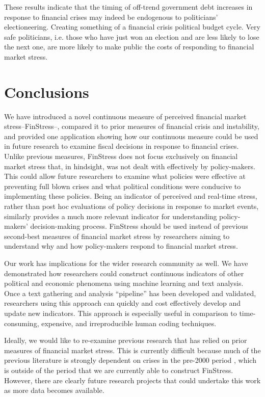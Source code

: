 \documentclass[]{article}
\begin{document}
These results indicate that the timing of off-trend government debt increases in response to financial crises may indeed be endogenous to politicians' electioneering. Creating something of a financial crisis political budget cycle. Very safe politicians, i.e. those who have just won an election and are less likely to lose the next one, are more likely to make public the costs of responding to financial market stress.


\section{Conclusions}\label{conclusions}

We have introduced a novel continuous measure of perceived financial market stress--FinStress--, compared it to prior measures of financial crisis and instability, and provided one application showing how our continuous measure could be used in future research to examine fiscal decisions in response to financial crises. Unlike previous measures, FinStress does not focus exclusively on financial market stress that, in hindsight, was not dealt with effectively by policy-makers. This could allow future researchers to examine what policies were effective at preventing full blown crises and what political conditions were conducive to implementing these policies. Being an indicator of perceived and real-time stress, rather than post hoc evaluations of policy decisions in response to market events, similarly provides a much more relevant indicator for understanding policy-makers' decision-making process. FinStress should be used instead of previous second-best measures of financial market stress by researchers aiming to understand why and how policy-makers respond to financial market stress.

Our work has implications for the wider research community as well. We have demonstrated how researchers could construct continuous indicators of other political and economic phenomena using machine learning and text analysis. Once a text gathering and analysis ``pipeline'' \citep{Leek2015} has been developed and validated, researchers using this approach can quickly and cost effectively develop and update new indicators. This approach is especially useful in comparison to time-consuming, expensive, and irreproducible human coding techniques.

Ideally, we would like to re-examine previous research that has relied on prior measures of financial market stress. This is currently difficult because much of the previous literature is strongly dependent on crises in the pre-2000 period \citep[see discussion in][]{GandrudHallerberg2015}, which is outside of the period that we are currently able to construct FinStress. However, there are clearly future research projects that could undertake this work as more data becomes available.
\end{document}
